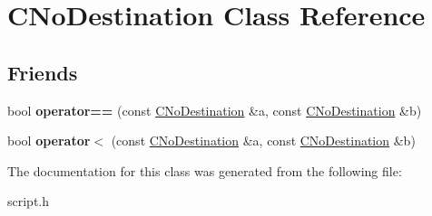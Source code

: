 \hypertarget{class_c_no_destination}{}\section{C\+No\+Destination Class Reference}
\label{class_c_no_destination}
\subsection*{Friends}
\begin{DoxyCompactItemize}
\item 
\mbox{\label{class_c_no_destination_a1b82081ed666bc8b1ba11d90122960b7}} 
bool {\bfseries operator==} (const \mbox{\hyperlink{class_c_no_destination}{C\+No\+Destination}} \&a, const \mbox{\hyperlink{class_c_no_destination}{C\+No\+Destination}} \&b)
\item 
\mbox{\label{class_c_no_destination_a0c469c10d44b10452fe9bfde8952713b}} 
bool {\bfseries operator$<$} (const \mbox{\hyperlink{class_c_no_destination}{C\+No\+Destination}} \&a, const \mbox{\hyperlink{class_c_no_destination}{C\+No\+Destination}} \&b)
\end{DoxyCompactItemize}


The documentation for this class was generated from the following file\+:\begin{DoxyCompactItemize}
\item 
script.\+h\end{DoxyCompactItemize}

